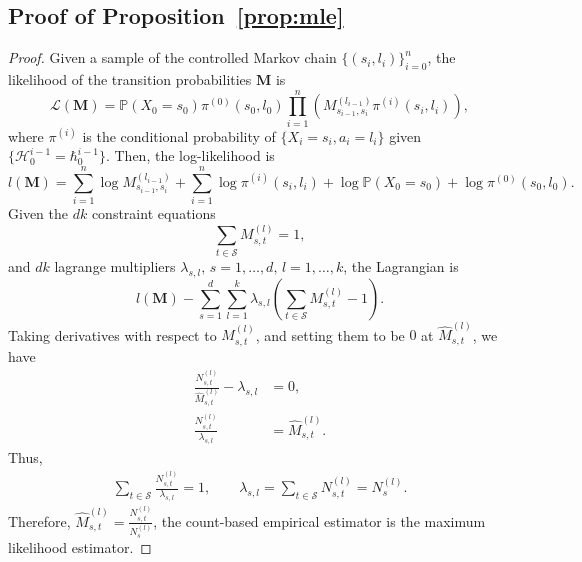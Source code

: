 \documentclass[twoside,11pt]{article}
\newcommand{\pow}[1]{^{(#1)}}%
\numberwithin{equation}{section}
\newcommand{\lp}{\left(}
\newcommand{\rp}{\right)}
\newcommand{\History}{\mathcal{H}}
\newcommand{\history}{\hbar}
\begin{document}
\subsection{Proof of Proposition~\ref{prop:mle}}
\label{sec:prf-mle}
\begin{proof}
    Given a sample of the controlled Markov chain $\{(s_i, l_i)\}_{i=0}^n$, the likelihood of the transition probabilities $\mathbf{M}$ is
    \[
    \mathcal L(\mathbf{M}) = \mathbb P(X_0 = s_0) \pi\pow 0(s_0, l_0) \prod_{i=1}^{n} \lp M_{s_{i-1}, s_i} \pow{l_{i-1}} \pi\pow i(s_i, l_i) \rp,
    \]
    where $\pi\pow i$ is the conditional probability of $\{X_i=s_i,a_i=l_i\}$ given $\{\History_0^{i-1}=\history_0^{i-1}\}$. Then,
    the log-likelihood is
    \[
    l(\mathbf{M}) = \sum_{i=1}^{n} \log M_{s_{i-1}, s_i} \pow {l_{i-1}}+ \sum_{i=1}^n \log \pi\pow i(s_i, l_i) + \log \mathbb P(X_0=s_0) + \log \pi\pow 0(s_0, l_0).
    \]
    Given the $dk$ constraint equations
    \[
    \sum_{t \in \mathcal S} M_{s, t} \pow l = 1,
    \]
    and $dk$ lagrange multipliers $\lambda_{s,l}, \, s=1, \ldots, d, \, l=1, \ldots, k$, the Lagrangian is
    \[
    l(\mathbf{M}) - \sum_{s=1}^d \sum_{l=1}^k \lambda_{s,l}\lp \sum_{t \in \mathcal S} M_{s, t} \pow l - 1 \rp.
    \]
    Taking derivatives with respect to $M_{s,t} \pow l$, and setting them to be $0$ at $\hat M_{s,t} \pow l$, we have
    \begin{align*}
        \frac{N_{s,t} \pow l}{\hat M_{s,t} \pow l} - \lambda_{s,l} &= 0, \\
        \frac{N_{s,t} \pow l}{\lambda_{s,l}} &= \hat M_{s,t} \pow l.
    \end{align*}
    Thus,
    \begin{align*}
        \sum_{t \in \mathcal S} \frac{N_{s,t} \pow l}{\lambda_{s,l}} = 1,\qquad  \lambda_{s,l} = \sum_{t \in \mathcal S} N_{s,t} \pow l = N_s \pow l.
    \end{align*}
    Therefore, $\hat M_{s,t} \pow l = \frac{N_{s,t} \pow l}{N_s \pow l}$, the count-based empirical estimator is the maximum likelihood estimator.
\end{proof}
\end{document}

